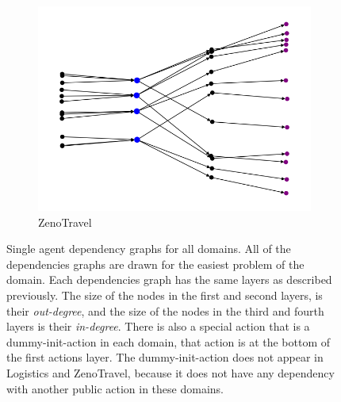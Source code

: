 \documentclass{article}
\theoremstyle{remark}
\begin{document}
\begin{figure}[t!]
\begin{subfigure}[b]{0.3\textwidth}
  \includegraphics[width=1\linewidth]{Dependencies_graphs/DepGraphZenoTravel}
  \caption{ZenoTravel}
  \label{fig:DepGraphZenoTravel}
\end{subfigure}\hspace{1em}
\caption{Single agent dependency graphs for all domains. All of the dependencies graphs are drawn for the easiest problem of the domain. Each dependencies graph has the same layers as described previously. The size of the nodes in the first and second layers, is their \emph{out-degree}, and the size of the nodes in the third and fourth layers is their \emph{in-degree}. There is also a special action that is a dummy-init-action in each domain, that action is at the bottom of the first actions layer. The dummy-init-action does not appear in Logistics and ZenoTravel, because it does not have any dependency with another public action in these domains.}
\label{fig:DependenciesGraphs}
\end{figure}
\end{document}
